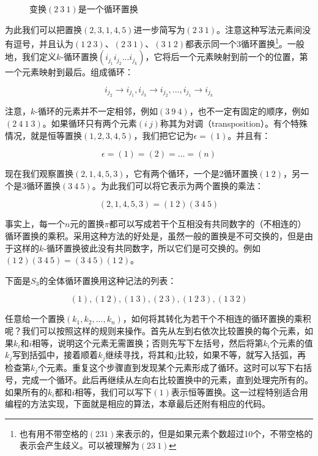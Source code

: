 \documentclass{article}
\begin{document}
\begin{figure}[htbp]
\centering
{}
\caption{变换$(2\ 3\ 1)$是一个循环置换}
\label{fig:cycle-permutation}
\end{figure}

为此我们可以把置换$(2, 3, 1, 4, 5)$进一步简写为$(2\ 3\ 1)$。注意这种写法元素间没有逗号，并且认为$(1\ 2\ 3)$、$(2\ 3\ 1)$、$(3\ 1\ 2)$都表示同一个3循环置换\footnote{也有用不带空格的$(231)$来表示的，但是如果元素个数超过10个，不带空格的表示会产生歧义。可以被理解为$(23\ 1)$}。一般地，我们定义$k$-循环置换$(i_{j_1} i_{j_2} ... i_{j_k})$，它将后一个元素映射到前一个的位置，第一个元素映射到最后。组成循环：

\[
i_{j_2} \to i_{j_1}, i_{j_3} \to i_{j_2}, ..., i_{j_1} \to i_{j_k}
\]

注意，$k$-循环的元素并不一定相邻，例如$(3\ 9\ 4)$，也不一定有固定的顺序，例如$(2\ 4\ 1\ 3)$。如果循环只有两个元素$(i\ j)$称其为对调（transposition）。有个特殊情况，就是恒等置换$(1, 2, 3, 4, 5)$，我们把它记为$\epsilon = (1)$。并且有：

\[
\epsilon = (1) = (2) = ... = (n)
\]

现在我们观察置换$(2, 1, 4, 5, 3)$，它有两个循环，一个是2循环置换$(1\ 2)$，另一个是3循环置换$(3\ 4\ 5)$。为此我们可以将它表示为两个置换的乘法：

\[
(2, 1, 4, 5, 3) = (1\ 2)(3\ 4\ 5)
\]

事实上，每一个$n$元的置换$\pi$都可以写成若干个互相没有共同数字的（不相连的）循环置换的乘积。采用这种方法的好处是，虽然一般的置换是不可交换的，但是由于这样的$k$-循环置换彼此没有共同数字，所以它们是可交换的。例如$(1\ 2)(3\ 4\ 5) = (3\ 4\ 5)(1\ 2)$。

下面是$S_3$的全体循环置换用这种记法的列表：

\[
(1),
(1\ 2), (1\ 3), (2\ 3),
(1\ 2\ 3), (1\ 3\ 2)
\]

任意给一个置换$(k_1, k_2, ..., k_n)$，如何将其转化为若干个不相连的循环置换的乘积呢？我们可以按照这样的规则来操作。首先从左到右依次比较置换的每个元素，如果$k_i$和$i$相等，说明这个元素无需置换；否则先写下左括号，然后将第$k_i$个元素的值$k_j$写到括弧中，接着顺着$k_j$继续寻找，将其和$j$比较，如果不等，就写入括弧，再检查第$k_j$个元素。重复这个步骤直到发现某个元素形成了循环。这时可以写下右括号，完成一个循环。此后再继续从左向右比较置换中的元素，直到处理完所有的。如果所有的$k_i$都和$i$相等，我们可以写下$(1)$表示恒等置换。这一过程特别适合用编程的方法实现，下面就是相应的算法，本章最后还附有相应的代码。
\end{document}
